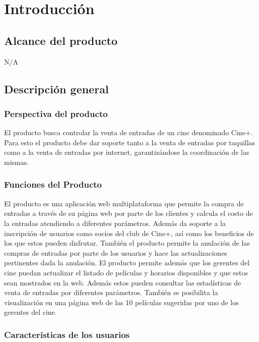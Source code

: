 \chapter{Introducción}

\section{Alcance del producto}

N/A

\section{Descripción general}

\subsection{Perspectiva del producto}

El producto busca controlar la venta de entradas de un cine denominado Cine+. Para esto el producto debe dar soporte tanto a la venta de entradas por taquillas como a la venta de entradas por internet, garantizándose la coordinación de las mismas.

\subsection{Funciones del Producto}

El producto es una aplicación web multiplataforma que permite la compra de entradas a través de su página web por parte de los clientes y calcula el costo de la entradas atendiendo a diferentes parámetros. Además da soporte a la inscripción de usuarios como socios del club de Cine+, así como los beneficios de los que estos pueden disfrutar. También el producto permite la anulación de las compras de entradas por parte de los usuarios y hace las actualizaciones pertinentes dada la anulación. El producto permite además que los gerentes del cine puedan actualizar el listado de películas y horarios disponibles y que estos sean mostrados en la web. Además estos pueden consultar las estadísticas de venta de entradas por diferentes parámetros. También se posibilita la visualización en una página web de las 10 películas sugeridas por uno de los gerentes del cine.

\subsection{Características de los usuarios}

